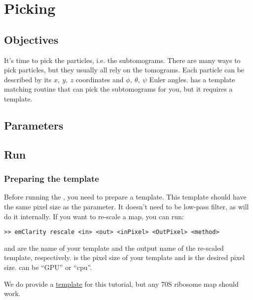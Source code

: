\section{Picking} \label{sec:picking}

\subsection{Objectives}

It's time to pick the particles, i.e. the subtomograms. There are many ways to pick particles, but they usually all rely on the tomograms. Each particle can be described by its $x,\ y,\ z$ coordinates and $\phi,\ \theta,\ \psi$ Euler angles. {\emClarity} has a template matching routine that can pick the subtomograms for you, but it requires a template.

\subsection{Parameters}



\subsection{Run} \label{sec:picking:run}

\subsubsection{Preparing the template}
Before running the , you need to prepare a template. This template should have the same pixel size as the  parameter. It doesn't need to be low-pass filter, as {\emClarity} will do it internally. If you want to re-scale a map, you can run:
\begin{lstlisting}
>> emClarity rescale <in> <out> <inPixel> <OutPixel> <method>
\end{lstlisting}
 and  are the name of your template and the output name of the re-scaled template, respectively.  is the pixel size of your template and  is the desired pixel size.  can be ``GPU'' or ``cpu''.


\begin{note}We do provide a \href{https://github.com/bHimes/emClarity}{template} for this tutorial, but any 70S ribosome map should work.
\end{note}

